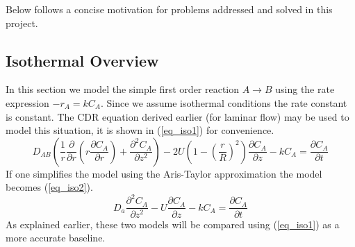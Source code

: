 \documentclass[11pt,fleqn]{article}
\theoremstyle{defstyle}
\begin{document}
Below follows a concise motivation for problems addressed and solved in this project. 
\subsection{Isothermal Overview}
In this section we model the simple first order reaction $A \rightarrow B$ using the rate expression $-r_A=kC_A$. Since we assume isothermal conditions the rate constant is constant. The CDR equation derived earlier (for laminar flow) may be used to model this situation, it is shown in (\ref{eq_iso1}) for convenience.
\begin{equation}
D_{AB}(\frac{1}{r}\frac{\partial}{\partial r}(r\frac{\partial C_A}{\partial r}) + \frac{\partial^2 C_A}{\partial z^2}) - 2U(1-(\frac{r}{R})^2)\frac{\partial C_A}{\partial z} - kC_A = \frac{\partial C_A}{\partial t}
\label{eq_iso1}
\end{equation} 
If one simplifies the model using the Aris-Taylor approximation the model becomes (\ref{eq_iso2}).
\begin{equation}
D_a \frac{\partial^2 C_A}{\partial z^2} - U \frac{\partial C_A}{\partial z} - kC_A = \frac{\partial C_A}{\partial t}
\label{eq_iso2}
\end{equation}
As explained earlier, these two models will be compared using (\ref{eq_iso1}) as a more accurate baseline.
\end{document}
